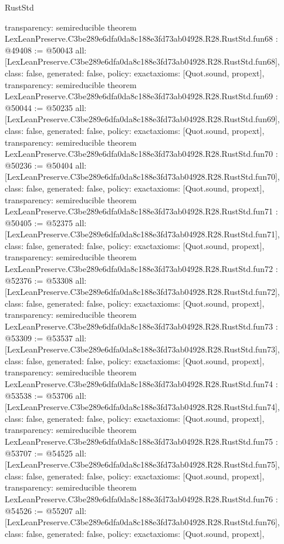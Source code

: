 \begin{lexlean}{RustStd}
\begin{coremodule}
{  transparency: semireducible
}
theorem LexLeanPreserve.C3be289e6dfa0da8c188e3fd73ab04928.R28.RustStd.fun68 : @49408 := @50043 {
  all: [LexLeanPreserve.C3be289e6dfa0da8c188e3fd73ab04928.R28.RustStd.fun68],
  class: false,
  generated: false,
  policy: exact{axioms: [Quot.sound, propext]},
  transparency: semireducible
}
theorem LexLeanPreserve.C3be289e6dfa0da8c188e3fd73ab04928.R28.RustStd.fun69 : @50044 := @50235 {
  all: [LexLeanPreserve.C3be289e6dfa0da8c188e3fd73ab04928.R28.RustStd.fun69],
  class: false,
  generated: false,
  policy: exact{axioms: [Quot.sound, propext]},
  transparency: semireducible
}
theorem LexLeanPreserve.C3be289e6dfa0da8c188e3fd73ab04928.R28.RustStd.fun70 : @50236 := @50404 {
  all: [LexLeanPreserve.C3be289e6dfa0da8c188e3fd73ab04928.R28.RustStd.fun70],
  class: false,
  generated: false,
  policy: exact{axioms: [Quot.sound, propext]},
  transparency: semireducible
}
theorem LexLeanPreserve.C3be289e6dfa0da8c188e3fd73ab04928.R28.RustStd.fun71 : @50405 := @52375 {
  all: [LexLeanPreserve.C3be289e6dfa0da8c188e3fd73ab04928.R28.RustStd.fun71],
  class: false,
  generated: false,
  policy: exact{axioms: [Quot.sound, propext]},
  transparency: semireducible
}
theorem LexLeanPreserve.C3be289e6dfa0da8c188e3fd73ab04928.R28.RustStd.fun72 : @52376 := @53308 {
  all: [LexLeanPreserve.C3be289e6dfa0da8c188e3fd73ab04928.R28.RustStd.fun72],
  class: false,
  generated: false,
  policy: exact{axioms: [Quot.sound, propext]},
  transparency: semireducible
}
theorem LexLeanPreserve.C3be289e6dfa0da8c188e3fd73ab04928.R28.RustStd.fun73 : @53309 := @53537 {
  all: [LexLeanPreserve.C3be289e6dfa0da8c188e3fd73ab04928.R28.RustStd.fun73],
  class: false,
  generated: false,
  policy: exact{axioms: [Quot.sound, propext]},
  transparency: semireducible
}
theorem LexLeanPreserve.C3be289e6dfa0da8c188e3fd73ab04928.R28.RustStd.fun74 : @53538 := @53706 {
  all: [LexLeanPreserve.C3be289e6dfa0da8c188e3fd73ab04928.R28.RustStd.fun74],
  class: false,
  generated: false,
  policy: exact{axioms: [Quot.sound, propext]},
  transparency: semireducible
}
theorem LexLeanPreserve.C3be289e6dfa0da8c188e3fd73ab04928.R28.RustStd.fun75 : @53707 := @54525 {
  all: [LexLeanPreserve.C3be289e6dfa0da8c188e3fd73ab04928.R28.RustStd.fun75],
  class: false,
  generated: false,
  policy: exact{axioms: [Quot.sound, propext]},
  transparency: semireducible
}
theorem LexLeanPreserve.C3be289e6dfa0da8c188e3fd73ab04928.R28.RustStd.fun76 : @54526 := @55207 {
  all: [LexLeanPreserve.C3be289e6dfa0da8c188e3fd73ab04928.R28.RustStd.fun76],
  class: false,
  generated: false,
  policy: exact{axioms: [Quot.sound, propext]},
}
\end{coremodule}
\end{lexlean}
